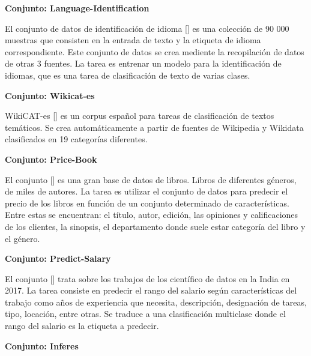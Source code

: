 \begin{annexes}
\begin{flushleft} 
    { \textbf{Conjunto: Language-Identification}}\label{description:languaje}
\end{flushleft}

El conjunto de datos de identificación de idioma [\cite{languaje-identification}] es una colección de 90 000 muestras que consisten en la entrada de texto y la 
etiqueta de idioma correspondiente. 
Este conjunto de datos se crea mediente la recopilación de datos de otras 3 fuentes. La tarea es entrenar un modelo para la identificación de idiomas, que es una tarea 
de clasificación de texto de varias clases.

\begin{flushleft} 
    { \textbf{Conjunto: Wikicat-es}}\label{description:wikicat}
\end{flushleft}

WikiCAT-es [\cite{wikicat}] es un corpus español para tareas de clasificación de textos temáticos. Se crea automáticamente a partir de fuentes de Wikipedia y Wikidata 
clasificados en 19 categorías diferentes. 

\begin{flushleft} 
    { \textbf{Conjunto: Price-Book}}\label{description:price}
\end{flushleft}

El conjunto [\cite{price-book}] es una gran base de datos de libros. Libros de diferentes géneros, de miles de autores. La tarea es utilizar el conjunto de datos para predecir el precio de 
los libros en función de un conjunto determinado de características. Entre estas se encuentran: el título, autor, edición, las opiniones y calificaciones de los 
clientes, la sinopsis, el departamento donde suele estar categoría del libro y el género. 


\begin{flushleft} 
    { \textbf{Conjunto: Predict-Salary}}\label{description:predict}
\end{flushleft}

El conjunto [\cite{predict-salary}] trata sobre los trabajos de los científico de datos en la India en 2017. La tarea consiste en predecir el rango del salario según características del 
trabajo como años de experiencia que necesita, descripción, designación de tareas, tipo, locación, entre otras. Se traduce a una clasificación multiclase donde el rango 
del salario es la etiqueta a predecir.

\begin{flushleft} 
    { \textbf{Conjunto: Inferes}}\label{description:inferes}
\end{flushleft}


\end{annexes}
